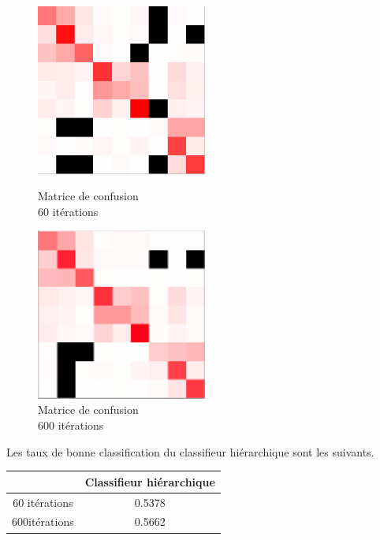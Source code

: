 \documentclass[a4paper,11pt]{report}
\begin{document}
\begin{figure}[H]
\centering

\begin{minipage}{.45\textwidth}
\centering
\includegraphics[width=0.5\textwidth ]{mc_60hier}\caption{Matrice de confusion \\60 itérations}
\end{minipage}
\begin{minipage}{.45\textwidth}
\centering
\includegraphics[width=0.5\textwidth]{mc_600hier}\caption{Matrice de confusion \\600 itérations}
\end{minipage}

\end{figure}

Les taux de bonne classification du classifieur hiérarchique sont les suivants.\\
\begin{center}
\begin{tabular}{|c|c|}
\hline
& Classifieur hiérarchique \\
\hline
\hline
60 itérations & 0.5378\\
600itérations & 0.5662\\
\hline
\end{tabular}
\end{center}
\end{document}
